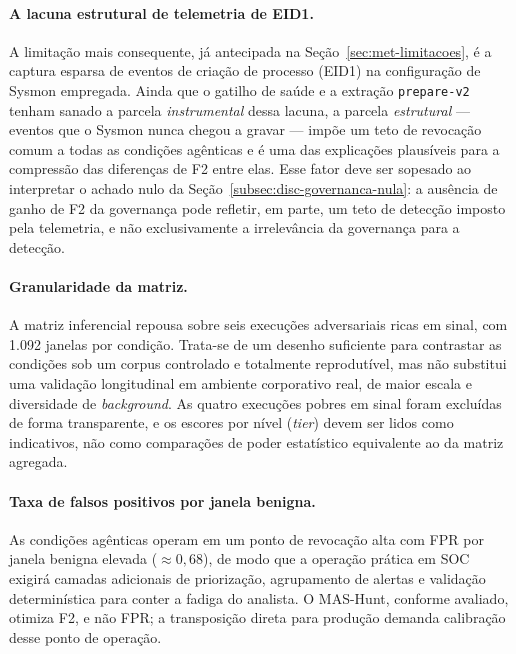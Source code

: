 \paragraph{A lacuna estrutural de telemetria de EID1.} A limitação mais
consequente, já antecipada na Seção~\ref{sec:met-limitacoes}, é a captura esparsa
de eventos de criação de processo (EID1) na configuração de Sysmon empregada.
Ainda que o gatilho de saúde e a extração \texttt{prepare-v2} tenham sanado a
parcela \emph{instrumental} dessa lacuna, a parcela \emph{estrutural} --- eventos
que o Sysmon nunca chegou a gravar --- impõe um teto de revocação comum a todas as
condições agênticas e é uma das explicações plausíveis para a compressão das
diferenças de F2 entre elas. Esse fator deve ser sopesado ao interpretar o achado
nulo da Seção~\ref{subsec:disc-governanca-nula}: a ausência de ganho de F2 da
governança pode refletir, em parte, um teto de detecção imposto pela telemetria, e
não exclusivamente a irrelevância da governança para a detecção.

\paragraph{Granularidade da matriz.} A matriz inferencial repousa sobre seis
execuções adversariais ricas em sinal, com 1.092 janelas por condição. Trata-se de
um desenho suficiente para contrastar as condições sob um corpus controlado e
totalmente reprodutível, mas não substitui uma validação longitudinal em ambiente
corporativo real, de maior escala e diversidade de \textit{background}. As quatro
execuções pobres em sinal foram excluídas de forma transparente, e os escores por
nível (\textit{tier}) devem ser lidos como indicativos, não como comparações de
poder estatístico equivalente ao da matriz agregada.

\paragraph{Taxa de falsos positivos por janela benigna.} As condições agênticas
operam em um ponto de revocação alta com FPR por janela benigna elevada
($\approx 0{,}68$), de modo que a operação prática em SOC exigirá camadas
adicionais de priorização, agrupamento de alertas e validação determinística para
conter a fadiga do analista. O MAS-Hunt, conforme avaliado, otimiza F2, e não FPR;
a transposição direta para produção demanda calibração desse ponto de operação.


